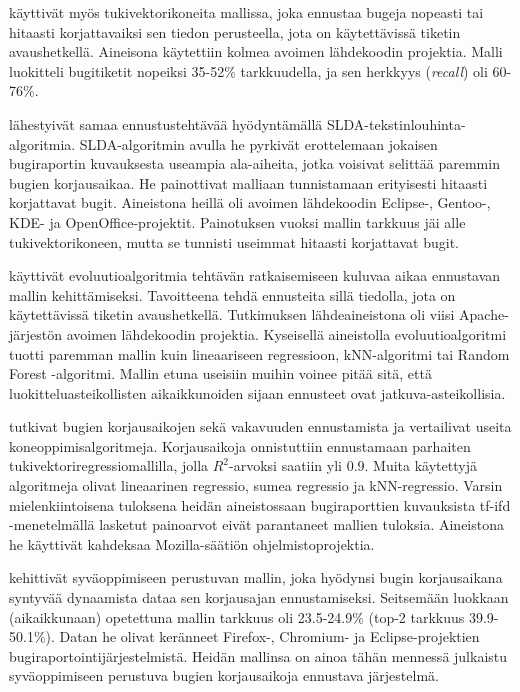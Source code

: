 \documentclass[utf8]{gradu3}
\begin{document}
\textcite{Ardimento-2017} käyttivät myös tukivektorikoneita mallissa, joka
ennustaa bugeja nopeasti tai hitaasti korjattavaiksi sen tiedon perusteella,
jota on käytettävissä tiketin avaushetkellä. Aineisona käytettiin kolmea avoimen
lähdekoodin projektia. Malli luokitteli bugitiketit nopeiksi 35-52\%
tarkkuudella, ja sen herkkyys (\textit{recall}) oli 60-76\%.

\textcite{Ardimento-2016} lähestyivät samaa ennustustehtävää hyödyntämällä
SLDA-tekstinlouhinta-algoritmia. SLDA-algoritmin avulla he pyrkivät erottelemaan
jokaisen bugiraportin kuvauksesta useampia ala-aiheita, jotka voisivat selittää
paremmin bugien korjausaikaa. He painottivat malliaan tunnistamaan erityisesti
hitaasti korjattavat bugit. Aineistona heillä oli avoimen lähdekoodin Eclipse-,
Gentoo-, KDE- ja OpenOffice-projektit. Painotuksen vuoksi mallin tarkkuus jäi
alle tukivektorikoneen, mutta se tunnisti useimmat hitaasti korjattavat bugit.

\textcite{Al-Zubaidi-2017} käyttivät evoluutioalgoritmia tehtävän ratkaisemiseen
kuluvaa aikaa ennustavan mallin kehittämiseksi. Tavoitteena tehdä ennusteita
sillä tiedolla, jota on käytettävissä tiketin avaushetkellä. Tutkimuksen
lähdeaineistona oli viisi Apache-järjestön avoimen lähdekoodin projektia.
Kyseisellä aineistolla evoluutioalgoritmi tuotti paremman mallin kuin
lineaariseen regressioon, kNN-algoritmi tai Random Forest -algoritmi. Mallin
etuna useisiin muihin voinee pitää sitä, että luokitteluasteikollisten
aikaikkunoiden sijaan ennusteet ovat jatkuva-asteikollisia.

\textcite{Sharma-2019} tutkivat bugien korjausaikojen sekä vakavuuden
ennustamista ja vertailivat useita koneoppimisalgoritmeja. Korjausaikoja
onnistuttiin ennustamaan parhaiten tukivektoriregressiomallilla, jolla
\(R^2\)-arvoksi saatiin yli 0.9. Muita käytettyjä algoritmeja olivat lineaarinen
regressio, sumea regressio ja kNN-regressio. Varsin mielenkiintoisena tuloksena
heidän aineistossaan bugiraporttien kuvauksista tf-ifd -menetelmällä lasketut
painoarvot eivät parantaneet mallien tuloksia. Aineistona he käyttivät kahdeksaa
Mozilla-säätiön ohjelmistoprojektia.

\textcite{Lee-2020} kehittivät syväoppimiseen perustuvan mallin, joka hyödynsi
bugin korjausaikana syntyvää dynaamista dataa sen korjausajan ennustamiseksi.
Seitsemään luokkaan (aikaikkunaan) opetettuna  mallin tarkkuus oli 23.5-24.9\%
(top-2 tarkkuus 39.9-50.1\%). Datan he olivat keränneet Firefox-, Chromium- ja
Eclipse-projektien bugiraportointijärjestelmistä. Heidän mallinsa on ainoa tähän
mennessä julkaistu syväoppimiseen perustuva bugien korjausaikoja ennustava
järjestelmä.
\end{document}
